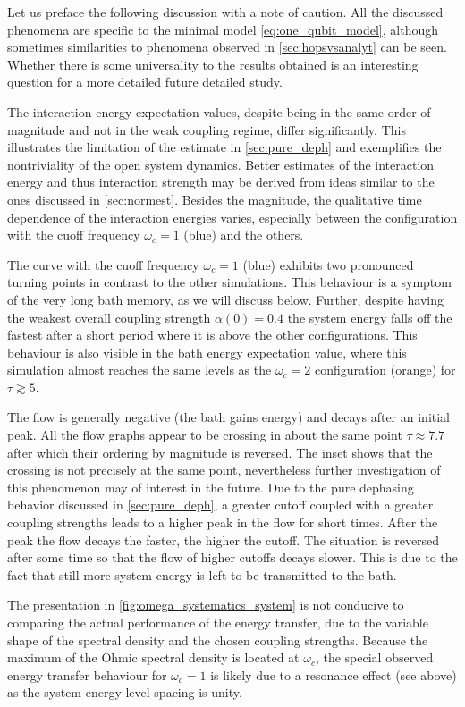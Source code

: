 Let us preface the following discussion with a note of caution. All
the discussed phenomena are specific to the minimal model
\cref{eq:one_qubit_model}, although sometimes similarities to
phenomena observed in \cref{sec:hopsvsanalyt} can be seen. Whether
there is some universality to the results obtained is an interesting
question for a more detailed future detailed study.

The interaction energy expectation values, despite being in the same
order of magnitude and not in the weak coupling regime, differ
significantly. This illustrates the limitation of the estimate in
\cref{sec:pure_deph} and exemplifies the nontriviality of the open
system dynamics. Better estimates of the interaction energy and thus
interaction strength may be derived from ideas similar to the ones
discussed in \cref{sec:normest}.  Besides the magnitude, the
qualitative time dependence of the interaction energies varies,
especially between the configuration with the cuoff frequency
\(ω_c=1\) (blue) and the others.

The curve with the cuoff frequency \(ω_c=1\) (blue) exhibits two
pronounced turning points in contrast to the other simulations. This
behaviour is a symptom of the very long bath memory, as we will
discuss below. Further, despite having the weakest overall coupling
strength \(α(0)=0.4\) the system energy falls off the fastest after a
short period where it is above the other configurations. This
behaviour is also visible in the bath energy expectation value, where
this simulation almost reaches the same levels as the \(ω_c=2\)
configuration (orange) for \(τ\gtrsim 5\).

The flow is generally negative (the bath gains energy) and decays
after an initial peak. All the flow graphs appear to be crossing in
about the same point \(τ\approx 7.7\) after which their ordering by
magnitude is reversed.  The inset shows that the crossing is not
precisely at the same point, nevertheless further investigation of
this phenomenon may of interest in the future.  Due to the pure
dephasing behavior discussed in \cref{sec:pure_deph}, a greater cutoff
coupled with a greater coupling strengths leads to a higher peak in
the flow for short times. After the peak the flow decays the faster,
the higher the cutoff. The situation is reversed after some time so
that the flow of higher cutoffs decays slower.  This is due to the
fact that still more system energy is left to be transmitted to the
bath.

The presentation in \cref{fig:omega_systematics_system} is not
conducive to comparing the actual performance of the energy transfer,
due to the variable shape of the spectral density and the chosen
coupling strengths. Because the maximum of the Ohmic spectral density
is located at \(ω_c\), the special observed energy transfer behaviour
for \(ω_c=1\) is likely due to a resonance effect (see above) as the
system energy level spacing is unity.

